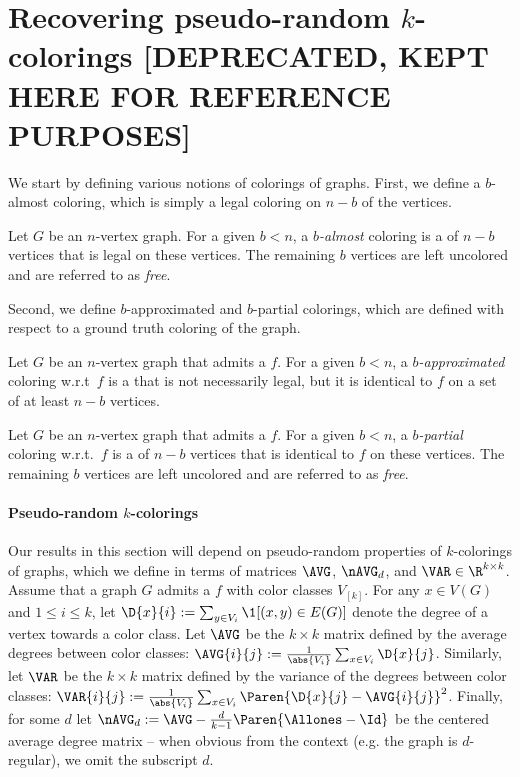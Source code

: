 \section{Recovering pseudo-random $k$-colorings [DEPRECATED, KEPT HERE FOR REFERENCE PURPOSES]}\label{sec: kcoloring}

We start by defining various notions of colorings of graphs.
First, we define a $b$-almost coloring, which is simply a legal coloring on $n-b$ of the vertices.

\begin{definition}
\label{def: almostcoloring}
    Let $G$ be an $n$-vertex graph.
    For a given $b<n$, a {\em $b$-almost} coloring is a \kcl of $n-b$ vertices that is legal on these vertices.
    The remaining $b$ vertices are left uncolored and are referred to as {\em free}.
\end{definition}

Second, we define $b$-approximated and $b$-partial colorings, which are defined with respect to a ground truth coloring of the graph.

\begin{definition}
    \label{def: approximatedcoloring}
    Let $G$ be an $n$-vertex graph that admits a \kcl $f$.
    For a given $b<n$, a {\em $b$-approximated} coloring w.r.t\ $f$ is a \kcl
    that is not necessarily legal, but it is identical to $f$ on a set of at least $n-b$ vertices.
\end{definition}

\begin{definition}
    \label{def: partialcoloring}
    Let $G$ be an $n$-vertex graph that admits a \kcl $f$.
    For a given $b<n$, a {\em $b$-partial} coloring w.r.t.\ $f$ is a \kcl of $n-b$ vertices that is identical to $f$ on these vertices.
    The remaining $b$ vertices are left uncolored and are referred to as {\em free}.
\end{definition}

\paragraph{Pseudo-random $k$-colorings}
    Our results in this section will depend on pseudo-random properties of $k$-colorings of graphs, which we define in terms of matrices $\AVG$, $\nAVG_d$, and $\VAR \in \R^{k \times k}$.
    Assume that a graph $G$ admits a \kcl $f$ with color classes $V_{[k]}$.
    For any $x\in V(G)$ and $1\leq i\leq k$, let $\D{x}{i}:=\sum_{y\in V_i} \1[(x, y)\in E(G)]$ denote the degree of a vertex towards a color class.
    Let $\AVG$ be the $k\times k$ matrix defined by the average degrees between color classes: $\AVG{i}{j}:=\frac{1}{\abs{V_i}}\sum_{x\in V_i} \D{x}{j}$.
    Similarly, let $\VAR$ be the $k\times k$ matrix defined by the variance of the degrees between color classes: $\VAR{i}{j}:=\frac{1}{\abs{V_i}}\sum_{x\in V_i} \Paren{\D{x}{j}-\AVG{i}{j}}^2$.
    Finally, for some $d$ let $\nAVG_d:=\AVG-\frac{d}{k-1}\Paren{\Allones-\Id}$ be the centered average degree matrix -- when obvious from the context (e.g. the graph is $d$-regular), we omit the subscript $d$.

